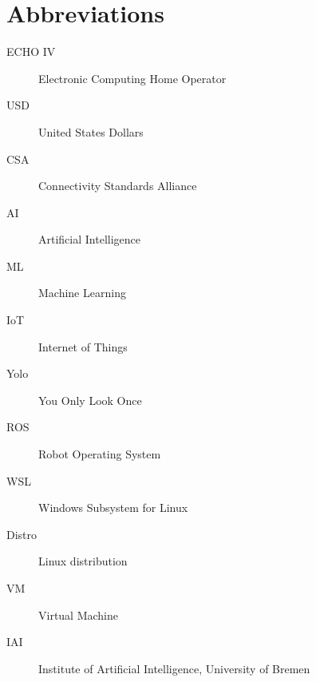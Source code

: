 \chapter*{Abbreviations}\label{abbr}
\begin{description}
\item[ECHO IV] Electronic Computing Home Operator
\item[USD] United States Dollars
\item[CSA] Connectivity Standards Alliance
\item[AI] Artificial Intelligence
\item[ML] Machine Learning 
\item[IoT] Internet of Things
\item[Yolo] You Only Look Once
\item[ROS] Robot Operating System
\item[WSL] Windows Subsystem for Linux
\item[Distro] Linux distribution
\item[VM] Virtual Machine
\item[IAI] Institute of Artificial Intelligence, University of Bremen 
\end{description}
